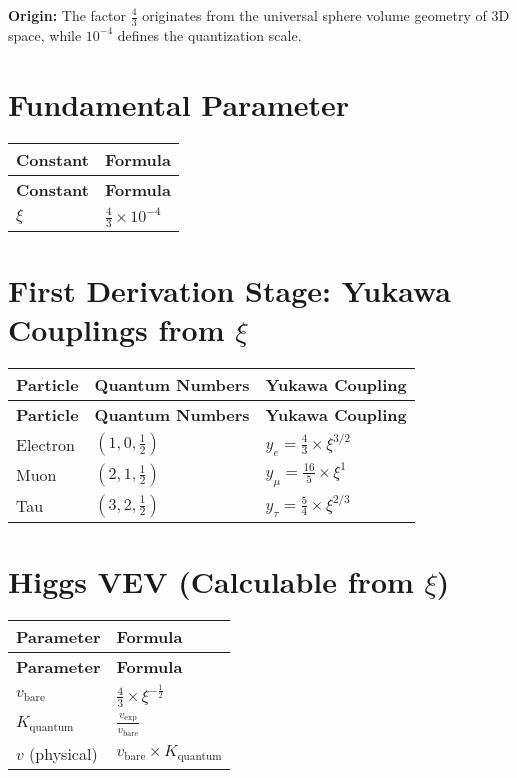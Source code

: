 \documentclass[12pt,a4paper]{article}
\begin{document}
	\textbf{Origin:} The factor \(\frac{4}{3}\) originates from the universal sphere volume geometry of 3D space, while \(10^{-4}\) defines the quantization scale.
	
	\section{Fundamental Parameter}
	
	\begin{longtable}{|p{3cm}|p{4cm}|}
		\hline
		\textbf{Constant} & \textbf{Formula} \\
		\hline
		\endfirsthead
		\hline
		\textbf{Constant} & \textbf{Formula} \\
		\hline
		\endhead
		\(\xi\) & \(\frac{4}{3} \times 10^{-4}\) \\
		\hline
	\end{longtable}
	
	\section{First Derivation Stage: Yukawa Couplings from \(\xi\)}
	
	\begin{longtable}{|p{2.5cm}|p{3cm}|p{4cm}|}
		\hline
		\textbf{Particle} & \textbf{Quantum Numbers} & \textbf{Yukawa Coupling} \\
		\hline
		\endfirsthead
		\hline
		\textbf{Particle} & \textbf{Quantum Numbers} & \textbf{Yukawa Coupling} \\
		\hline
		\endhead
		Electron & \((1,0,\frac{1}{2})\) & \(y_e = \frac{4}{3} \times \xi^{3/2}\) \\
		\hline
		Muon & \((2,1,\frac{1}{2})\) & \(y_{\mu} = \frac{16}{5} \times \xi^{1}\) \\
		\hline
		Tau & \((3,2,\frac{1}{2})\) & \(y_{\tau} = \frac{5}{4} \times \xi^{2/3}\) \\
		\hline
	\end{longtable}
	
	\section{Higgs VEV (Calculable from \(\xi\))}
	
	\begin{longtable}{|p{3cm}|p{4cm}|}
		\hline
		\textbf{Parameter} & \textbf{Formula} \\
		\hline
		\endfirsthead
		\hline
		\textbf{Parameter} & \textbf{Formula} \\
		\hline
		\endhead
		\(v_{\text{bare}}\) & \(\frac{4}{3} \times \xi^{-\frac{1}{2}}\) \\
		\hline
		\(K_{\text{quantum}}\) & \(\frac{v_{\text{exp}}}{v_{\text{bare}}}\) \\
		\hline
		\(v\) (physical) & \(v_{\text{bare}} \times K_{\text{quantum}}\) \\
		\hline
	\end{longtable}
	
\end{document}
